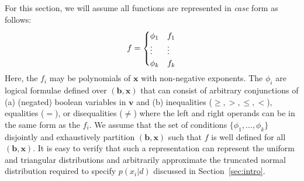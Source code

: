 \documentclass[letterpaper]{article}
\renewcommand{\vec}[1]{\mathbf{#1}}
\begin{document}
{For this section, we will assume all functions
are represented in \emph{case} form as follows:
\vspace{-5mm}
{%
\begin{align}
f = 
\begin{cases}
  \phi_1 & f_1 \\ 
  \vdots & \vdots \\ 
  \phi_k & f_k \\ 
  \vspace{-6mm}
\end{cases} \label{eq:case}
\end{align}
} 
Here, the $f_i$ may be polynomials of $\vec{x}$ with non-negative
exponents.  The $\phi_i$ are logical formulae defined over
$(\vec{b},\vec{x})$ that can consist of arbitrary conjunctions of (a)
(negated) boolean variables in $\vec{v}$ and (b) inequalities
($\geq,>,\leq,<$), equalities ($=$), or disequalities ($\neq$) where
the left and right operands can be in the same form as the $f_i$.  We
assume that the set of conditions $\{ \phi_1,\ldots,\phi_k \}$ 
disjointly and exhaustively partition $(\vec{b},\vec{x})$ such that $f$
is well defined for all $(\vec{b},\vec{x})$.  It is easy to verify
that such a representation can represent the uniform and triangular
distributions and arbitrarily approximate the truncated normal 
distribution required to specify $p(x_i|d)$ discussed in 
Section~\ref{sec:intro}.


}
\end{document}

